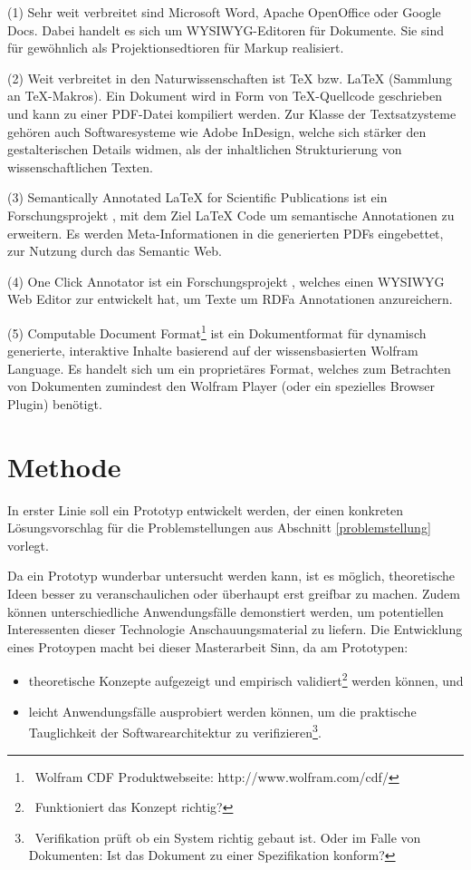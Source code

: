 (1) Sehr weit verbreitet sind Microsoft Word, Apache OpenOffice oder Google Docs. Dabei handelt es sich um WYSIWYG-Editoren für Dokumente. Sie sind für gewöhnlich als Projektionsedtioren für Markup realisiert.

 
(2) Weit verbreitet in den Naturwissenschaften ist TeX bzw. LaTeX (Sammlung an TeX-Makros). Ein Dokument wird in Form von TeX-Quellcode geschrieben und kann zu einer PDF-Datei kompiliert werden. Zur Klasse der Textsatzysteme gehören auch Softwaresysteme wie Adobe InDesign, welche sich stärker den gestalterischen Details widmen, als der inhaltlichen Strukturierung von wissenschaftlichen Texten.

 
(3) Semantically Annotated LaTeX for Scientific Publications ist ein Forschungsprojekt \citep{Groza}, mit dem Ziel LaTeX Code um semantische Annotationen zu erweitern. Es werden Meta-Informationen in die generierten PDFs eingebettet, zur Nutzung durch das Semantic Web.

 
(4) One Click Annotator ist ein Forschungsprojekt \citep{Heese}, welches einen WYSIWYG Web Editor zur entwickelt hat, um Texte um RDFa Annotationen anzureichern.

 
(5) Computable Document Format\footnote{~Wolfram CDF Produktwebseite: http://www.wolfram.com/cdf/} ist ein Dokumentformat für dynamisch generierte, interaktive Inhalte basierend auf der wissensbasierten Wolfram Language. Es handelt sich um ein proprietäres Format, welches zum Betrachten von Dokumenten zumindest den Wolfram Player (oder ein spezielles Browser Plugin) benötigt.

 
\section{Methode}\label{}
 
In erster Linie soll ein Prototyp entwickelt werden, der einen konkreten Lösungsvorschlag für die Problemstellungen aus Abschnitt \ref{problemstellung} vorlegt.

 
Da ein Prototyp wunderbar untersucht werden kann, ist es möglich, theoretische Ideen besser zu veranschaulichen oder überhaupt erst greifbar zu machen. Zudem können unterschiedliche Anwendungsfälle demonstiert werden, um potentiellen Interessenten dieser Technologie Anschauungsmaterial zu liefern. Die Entwicklung eines Protoypen macht bei dieser Masterarbeit Sinn, da am Prototypen:

 
\begin{itemize}

\item theoretische Konzepte aufgezeigt und empirisch validiert\footnote{~Funktioniert das Konzept richtig?} werden können, und
\item leicht Anwendungsfälle ausprobiert werden können, um die praktische Tauglichkeit der Softwarearchitektur zu verifizieren\footnote{~Verifikation prüft ob ein System richtig gebaut ist. Oder im Falle von Dokumenten: Ist das Dokument zu einer Spezifikation konform?}.
\end{itemize}
 
